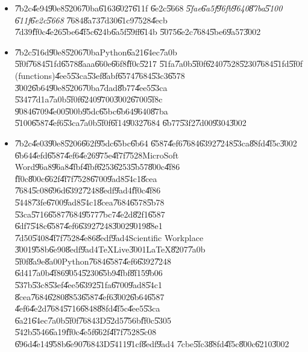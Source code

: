 \documentclass[12pt,a4paper]{article}
\begin{document}
\begin{itemize}
\item \U{7b2c}\U{4e94}\U{90e8}\U{5206}\U{70ba}\U{6163}\U{6027}\U{611f}%
\U{6e2c}\U{5668} \textit{\U{5fae}\U{6a5f}\U{96fb}\U{9640}\U{87ba}\U{5100}%
\U{611f}\U{6e2c}\U{5668} }\U{7684}\U{8a73}\U{7d30}\U{61c9}\U{7528}\U{4ecb}%
\U{7d39}\U{ff0c}\U{4e26}\U{5be6}\U{4f5c}\U{624b}\U{6a5f}\U{59ff}\U{614b}%
\U{5075}\U{6e2c}\U{7684}\U{5be6}\U{9a57}\U{3002}

\item \U{7b2c}\U{516d}\U{90e8}\U{5206}\U{70ba}Python\U{6a21}\U{64ec}\U{7a0b}%
\U{5f0f}\U{7684}\U{51fd}\U{6578}\U{8aaa}\U{660e}\U{66f8}\U{ff0c}\U{5217}%
\U{51fa}\U{7a0b}\U{5f0f}\U{6240}\U{7528}\U{5230}\U{7684}\U{51fd}\U{5f0f}%
(functions)\U{4ee5}\U{53ca}\U{53ef}\U{8abf}\U{6574}\U{7684}\U{53c3}\U{6578}%
\U{3002}\U{6b64}\U{90e8}\U{5206}\U{70ba}\U{7dad}\U{8b77}\U{4ee5}\U{53ca}%
\U{5347}\U{7d1a}\U{7a0b}\U{5f0f}\U{6240}\U{9700}\U{3002}\U{6700}\U{5f8c}%
\U{9084}\U{6709}\U{4e00}\U{500b}\U{95dc}\U{65bc}\U{6b64}\U{9640}\U{87ba}%
\U{5100}\U{6587}\U{4ef6}\U{53ca}\U{7a0b}\U{5f0f}\U{6f14}\U{9032}\U{7684}%
\U{6b77}\U{53f2}\U{7d00}\U{9304}\U{3002}

\item \U{7b2c}\U{4e03}\U{90e8}\U{5206}\U{662f}\U{95dc}\U{65bc}\U{6b64}%
\U{6587}\U{4ef6}\U{7684}\U{6392}\U{7248}\U{53ca}\U{88fd}\U{4f5c}\U{3002}%
\U{6b64}\U{4efd}\U{6587}\U{4ef6}\U{4e26}\U{975e}\U{4f7f}\U{7528}MicroSoft
Word\U{96a8}\U{96a8}\U{4fbf}\U{4fbf}\U{6253}\U{6253}\U{5b57}\U{800c}\U{4f86}%
\U{ff0c}\U{800c}\U{662f}\U{4f7f}\U{7528}\U{6700}\U{9ad8}\U{54c1}\U{8cea}%
\U{7684}\U{5c08}\U{696d}\U{6392}\U{7248}\U{8edf}\U{9ad4}\U{ff0c}\U{4f86}%
\U{5448}\U{73fe}\U{6700}\U{9ad8}\U{54c1}\U{8cea}\U{7684}\U{6578}\U{5b78}%
\U{53ca}\U{5716}\U{6587}\U{7684}\U{9577}\U{7bc7}\U{4e2d}\U{82f1}\U{6587}%
\U{6df7}\U{548c}\U{6587}\U{4ef6}\U{6392}\U{7248}\U{3002}\U{9019}\U{88e1}%
\U{7d50}\U{5408}\U{4f7f}\U{7528}\U{4e86}\U{8edf}\U{9ad4}Scientific Workplace%
\U{3001}\U{958b}\U{6e90}\U{8edf}\U{9ad4}TeXLive\U{3001}LaTeX\U{8207}\U{7a0b}%
\U{5f0f}\U{8a9e}\U{8a00}Python\U{7684}\U{6587}\U{4ef6}\U{6392}\U{7248}%
\U{6d41}\U{7a0b}\U{4f86}\U{9054}\U{5230}\U{65b9}\U{4fbf}\U{8f15}\U{9b06}%
\U{537b}\U{53c8}\U{53ef}\U{4ee5}\U{6392}\U{51fa}\U{6700}\U{9ad8}\U{54c1}%
\U{8cea}\U{7684}\U{6280}\U{8853}\U{6587}\U{4ef6}\U{3002}\U{6b64}\U{6587}%
\U{4ef6}\U{4e2d}\U{7684}\U{5716}\U{6848}\U{88fd}\U{4f5c}\U{4ee5}\U{53ca}%
\U{6a21}\U{64ec}\U{7a0b}\U{5f0f}\U{7684}3D\U{52d5}\U{756b}\U{ff0c}\U{5305}%
\U{542b}\U{5546}\U{6a19}\U{ff0c}\U{4e5f}\U{662f}\U{4f7f}\U{7528}\U{5c08}%
\U{696d}\U{4e14}\U{958b}\U{6e90}\U{7684}3D\U{5411}\U{91cf}\U{8edf}\U{9ad4}%
\U{7cbe}\U{5fc3}\U{88fd}\U{4f5c}\U{800c}\U{6210}\U{3002}
\end{itemize}
\end{document}
